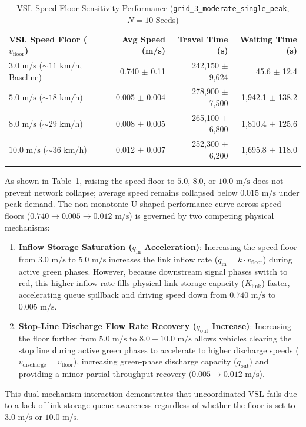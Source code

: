 \documentclass[3p,times,procedia]{elsarticle}
\begin{document}
\begin{table}[htbp]
\caption{VSL Speed Floor Sensitivity Performance (\texttt{grid\_3\_moderate\_single\_peak}, $N=10$ Seeds)}
\label{tab:vsl_floors}
\begin{tabular*}{\hsize}{@{\extracolsep{\fill}}lrrr@{}}
\toprule
\textbf{VSL Speed Floor ($v_{\text{floor}}$)} & \textbf{Avg Speed (m/s)} & \textbf{Travel Time (s)} & \textbf{Waiting Time (s)} \\
\colrule
$3.0\text{ m/s}$ ($\sim 11\text{ km/h}$, Baseline) & 0.740 $\pm$ 0.11 & 242,150 $\pm$ 9,624 & 45.6 $\pm$ 12.4 \\
$5.0\text{ m/s}$ ($\sim 18\text{ km/h}$) & 0.005 $\pm$ 0.004 & 278,900 $\pm$ 7,500 & 1,942.1 $\pm$ 138.2 \\
$8.0\text{ m/s}$ ($\sim 29\text{ km/h}$) & 0.008 $\pm$ 0.005 & 265,100 $\pm$ 6,800 & 1,810.4 $\pm$ 125.6 \\
$10.0\text{ m/s}$ ($\sim 36\text{ km/h}$) & 0.012 $\pm$ 0.007 & 252,300 $\pm$ 6,200 & 1,695.8 $\pm$ 118.0 \\
\botrule
\end{tabular*}
\end{table}

As shown in Table~\ref{tab:vsl_floors}, raising the speed floor to $5.0$, $8.0$, or $10.0\text{ m/s}$ does not prevent network collapse; average speed remains collapsed below $0.015\text{ m/s}$ under peak demand. The non-monotonic U-shaped performance curve across speed floors ($0.740 \rightarrow 0.005 \rightarrow 0.012\text{ m/s}$) is governed by two competing physical mechanisms:
\begin{enumerate}
    \item \textbf{Inflow Storage Saturation ($q_{\text{in}}$ Acceleration)}: Increasing the speed floor from $3.0\text{ m/s}$ to $5.0\text{ m/s}$ increases the link inflow rate ($q_{\text{in}} = k \cdot v_{\text{floor}}$) during active green phases. However, because downstream signal phases switch to red, this higher inflow rate fills physical link storage capacity ($K_{\text{link}}$) faster, accelerating queue spillback and driving speed down from $0.740\text{ m/s}$ to $0.005\text{ m/s}$.
    \item \textbf{Stop-Line Discharge Flow Rate Recovery ($q_{\text{out}}$ Increase)}: Increasing the floor further from $5.0\text{ m/s}$ to $8.0 - 10.0\text{ m/s}$ allows vehicles clearing the stop line during active green phases to accelerate to higher discharge speeds ($v_{\text{discharge}} = v_{\text{floor}}$), increasing green-phase discharge capacity ($q_{\text{out}}$) and providing a minor partial throughput recovery ($0.005 \rightarrow 0.012\text{ m/s}$).
\end{enumerate}
This dual-mechanism interaction demonstrates that uncoordinated VSL fails due to a lack of link storage queue awareness regardless of whether the floor is set to $3.0\text{ m/s}$ or $10.0\text{ m/s}$.
\end{document}
